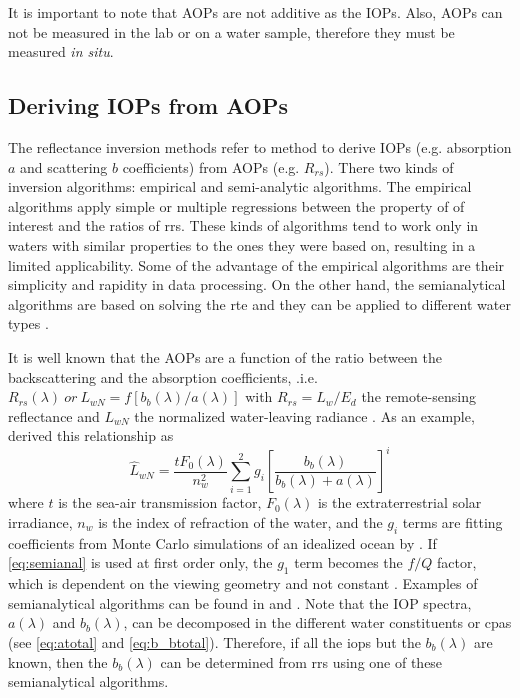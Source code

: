 It is important to note that AOPs are not additive as the IOPs. Also, AOPs can not be measured in the lab or on a water sample, therefore they must be measured {\it in situ}.

\subsection{Deriving IOPs from AOPs}
\label{subsec:semianalitic}
The reflectance inversion methods refer to method to derive IOPs (e.g. absorption $a$ and scattering $b$ coefficients) from AOPs (e.g. $R_{rs}$). There two kinds of inversion algorithms: empirical and semi-analytic algorithms. The empirical algorithms apply simple or multiple regressions between the property of of interest and the ratios of \gls{rrs}. These kinds of algorithms tend to work only in waters with similar properties to the ones they were based on, resulting in a limited applicability. Some of the advantage of the empirical algorithms are their simplicity and rapidity in data processing. On the other hand, the semianalytical algorithms are based on solving the \gls{rte} and they can be applied to different water types \cite{Lee2002_invQAA}.

It is well known that the AOPs are a function of the ratio between the backscattering and the absorption coefficients, .i.e. $R_{rs}(\lambda)~or~L_{wN} = f[b_b(\lambda)/a(\lambda)]$ with $R_{rs}=L_w/E_d$ the remote-sensing reflectance and $L_{wN}$ the normalized water-leaving radiance \cite{Morel:1977rw,Maritorena:02}. As an example, \cite{Gordon:1988qv} derived this relationship as
\begin{equation}\label{eq:semianal}
  \hat{L}_{wN} = \frac{tF_0(\lambda)}{n_w^2} \sum_{i=1}^2g_i\left[\frac{b_b(\lambda)}{b_b(\lambda)+a(\lambda)}\right]^i
\end{equation}
\noindent where $t$ is the sea-air transmission factor, $F_0(\lambda)$ is the extraterrestrial solar irradiance, $n_w$ is the index of refraction of the water, and the $g_i$ terms are fitting coefficients from Monte Carlo simulations of an idealized ocean by \cite{Gordon:1986fr}. If \autoref{eq:semianal} is used at first order only, the $g_1$ term becomes the $f/Q$ factor, which is dependent on the viewing geometry and not constant \cite{Maritorena:02}. Examples of semianalytical algorithms can be found in \cite{Lee2002_invQAA} and \cite{Werdell2013_inv}. Note that the IOP spectra, $a(\lambda)$ and $b_b(\lambda)$, can be decomposed in the different water constituents or \gls{cpas} (see \autoref{eq:atotal} and \autoref{eq:b_btotal}). Therefore, if all the \gls{iops} but the $b_b(\lambda)$ are known, then the $b_b(\lambda)$ can be determined from \gls{rrs} using one of these semianalytical algorithms.

